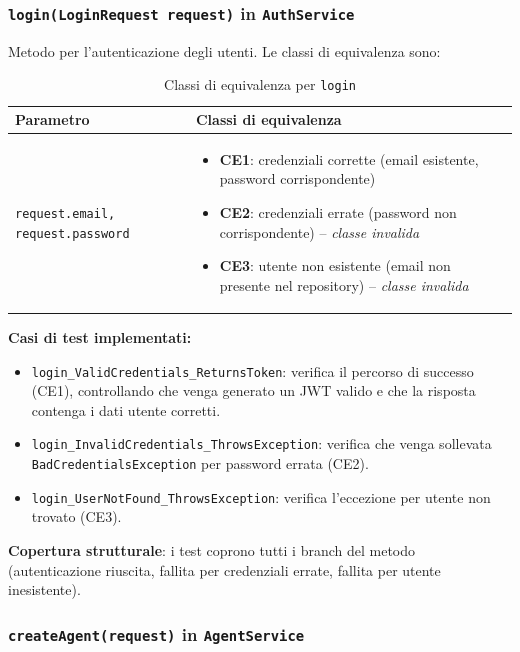 \documentclass[a4paper,11pt]{report}
\begin{document}
\subsubsection*{\texttt{login(LoginRequest request)} in \texttt{AuthService}}

Metodo per l'autenticazione degli utenti. Le classi di equivalenza sono:

\begin{table}[H]
\centering
\small
\renewcommand{\arraystretch}{1.3}
\begin{tabularx}{\textwidth}{|l|X|}
\toprule
\textbf{Parametro} & \textbf{Classi di equivalenza} \\
\midrule
\texttt{request.email, request.password} & 
\begin{itemize}[nosep, leftmargin=*]
  \item \textbf{CE1}: credenziali corrette (email esistente, password corrispondente)
  \item \textbf{CE2}: credenziali errate (password non corrispondente) -- \emph{classe invalida}
  \item \textbf{CE3}: utente non esistente (email non presente nel repository) -- \emph{classe invalida}
\end{itemize} \\
\bottomrule
\end{tabularx}
\caption{Classi di equivalenza per \texttt{login}}
\end{table}

\textbf{Casi di test implementati:}

\begin{itemize}[nosep]
  \item \texttt{login\_ValidCredentials\_ReturnsToken}: verifica il percorso di successo (CE1), controllando che venga generato un JWT valido e che la risposta contenga i dati utente corretti.
  \item \texttt{login\_InvalidCredentials\_ThrowsException}: verifica che venga sollevata \texttt{BadCredentialsException} per password errata (CE2).
  \item \texttt{login\_UserNotFound\_ThrowsException}: verifica l'eccezione per utente non trovato (CE3).
\end{itemize}

\textbf{Copertura strutturale}: i test coprono tutti i branch del metodo (autenticazione riuscita, fallita per credenziali errate, fallita per utente inesistente).

\subsubsection*{\texttt{createAgent(request)} in \texttt{AgentService}}
\end{document}
